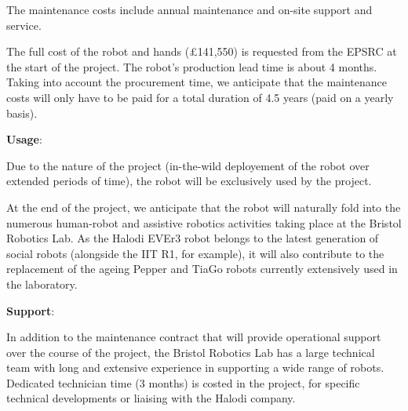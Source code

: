 The maintenance costs include annual maintenance and on-site support and service.

The full cost of the robot and hands (£141,550) is requested from the EPSRC at
the start of the project. The robot's production lead time is about 4 months.
Taking into account the procurement time, we anticipate that the maintenance
costs will only have to be paid for a total duration of 4.5 years (paid on a
yearly basis).


\textbf{Usage}:


Due to the nature of the project (in-the-wild deployement of the robot over
extended periods of time), the robot will be exclusively used by the project.

At the end of the project, we anticipate that the robot will naturally
fold into the numerous human-robot and assistive robotics activities taking
place at the Bristol Robotics Lab. As the Halodi EVEr3 robot belongs to the
latest generation of social robots (alongside the IIT R1, for example), it will
also contribute to the replacement of the ageing Pepper and TiaGo robots
currently extensively used in the laboratory.


\textbf{Support}: 


In addition to the maintenance contract that will provide operational support
over the course of the project, the Bristol Robotics Lab has a large technical
team with long and extensive experience in supporting a wide range of robots.
Dedicated technician time (3 months) is costed in the project, for specific
technical developments or liaising with the Halodi company.

